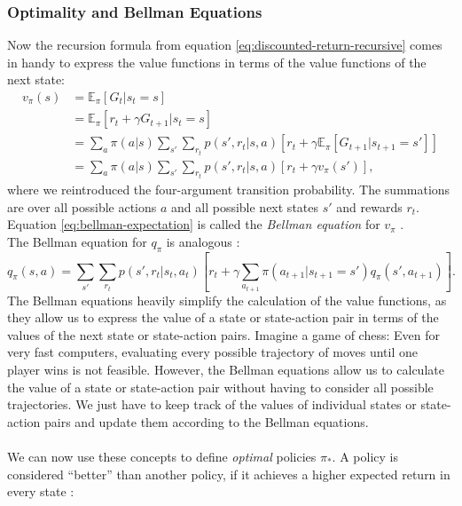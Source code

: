 \subsubsection{Optimality and Bellman Equations}
Now the recursion formula from equation \ref{eq:discounted-return-recursive} comes in handy to express the value functions in terms of the value functions of the next state:
\begin{align}
    v_\pi(s) &= \mathbb{E}_\pi[G_t | s_t = s] \nonumber \\
    &= \mathbb{E}_\pi[r_t + \gamma G_{t+1} | s_t = s] \nonumber \\
    &= \sum_a \pi(a|s) \sum_{s'} \sum_{r_t} p(s', r_t | s, a) \left[ r_t + \gamma \mathbb{E}_\pi[G_{t+1} | s_{t+1} = s'] \right] \nonumber \\
    &= \sum_a \pi(a|s) \sum_{s'} \sum_{r_t} p(s', r_t | s, a) \left[ r_t + \gamma v_\pi(s') \right] \text{,}
    \label{eq:bellman-expectation}
\end{align}
where we reintroduced the four-argument transition probability. The summations are over all possible actions $a$ and all possible next states $s'$ and rewards $r_t$. Equation \ref{eq:bellman-expectation} is called the \textit{Bellman equation} for $v_\pi$ \cite[59]{sutton_reinforcement_nodate}.\\
The Bellman equation for $q_\pi$ is analogous \cite{openai_spinning_up_rl_intro}:
\begin{equation}
    q_\pi(s, a) = \sum_{s'} \sum_{r_t} p(s', r_t | s_t, a_t) \left[ r_t + \gamma \sum_{a_{t+1}} \pi(a_{t+1}|s_{t+1}=s') q_\pi(s', a_{t+1}) \right] \text{.}
    \label{eq:bellman-expectation-action-value}
\end{equation}
The Bellman equations heavily simplify the calculation of the value functions, as they allow us to express the value of a state or state-action pair in terms of the values of the next state or state-action pairs.
Imagine a game of chess: Even for very fast computers, evaluating every possible trajectory of moves until one player wins is not feasible.
However, the Bellman equations allow us to calculate the value of a state or state-action pair without having to consider all possible trajectories.
We just have to keep track of the values of individual states or state-action pairs and update them according to the Bellman equations.
\\
\\
We can now use these concepts to define \textit{optimal} policies $\pi_*$. A policy is considered \enquote{better} than another policy, if it achieves a higher expected return in every state \cite[62]{sutton_reinforcement_nodate}:
